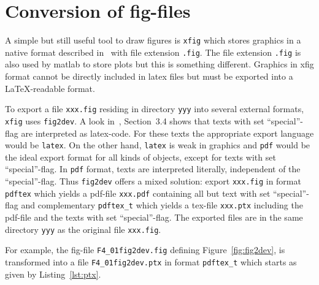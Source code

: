 \section{Conversion of fig-files}\label{sec:fig2dev}

A simple but still useful tool to draw figures is \texttt{xfig} 
which stores graphics in a native format 
described in~\cite{XFigF} with file extension \texttt{.fig}. 
The file extension \texttt{.fig} is also used by matlab to store plots 
but this is something different. 
Graphics in xfig format cannot be directly included in latex files 
but must be exported into a \LaTeX-readable format. 

To export a file \texttt{xxx.fig} residing in directory \texttt{yyy} 
into several external formats, 
\texttt{xfig} uses \texttt{fig2dev}. 
A look in~\cite{XFigF}, Section~3.4 shows that texts with set ``special''-flag 
are interpreted as latex-code. 
For these texts the appropriate export language would be \texttt{latex}. 
On the other hand, \texttt{latex} is weak in graphics 
and \texttt{pdf} would be the ideal export format for all kinds of objects, 
except for texts with set ``special''-flag. 
In \texttt{pdf} format, texts are interpreted literally, 
independent of the ``special''-flag. 
Thus \texttt{fig2dev} offers a mixed solution: 
export \texttt{xxx.fig} in format \texttt{pdftex} which yields a pdf-file 
\texttt{xxx.pdf} containing all but text with set ``special''-flag 
and complementary \texttt{pdftex\_t} which yields a tex-file \texttt{xxx.ptx} 
including the pdf-file and the texts with set ``special''-flag. 
The exported files are in the same directory \texttt{yyy} 
as the original file \texttt{xxx.fig}. 

For example, 
the fig-file \texttt{F4\_01fig2dev.fig} defining Figure~\ref{fig:fig2dev}, 
is transformed into a file \texttt{F4\_01fig2dev.ptx} 
in format \texttt{pdftex\_t} which starts as given by Listing~\ref{lst:ptx}. 



